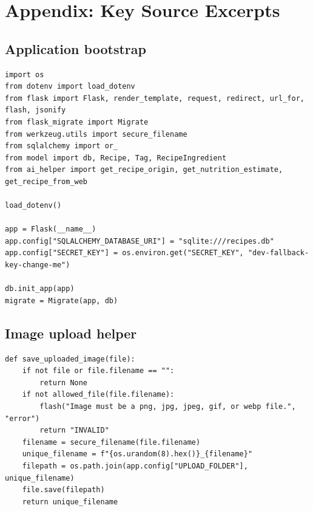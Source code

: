\documentclass[11pt,a4paper]{article}
\begin{document}
\appendix
\section{Appendix: Key Source Excerpts}

\subsection{Application bootstrap}
\begin{lstlisting}[caption={app.py --- imports and app setup}]
import os
from dotenv import load_dotenv
from flask import Flask, render_template, request, redirect, url_for, flash, jsonify
from flask_migrate import Migrate
from werkzeug.utils import secure_filename
from sqlalchemy import or_
from model import db, Recipe, Tag, RecipeIngredient
from ai_helper import get_recipe_origin, get_nutrition_estimate, get_recipe_from_web

load_dotenv()

app = Flask(__name__)
app.config["SQLALCHEMY_DATABASE_URI"] = "sqlite:///recipes.db"
app.config["SECRET_KEY"] = os.environ.get("SECRET_KEY", "dev-fallback-key-change-me")

db.init_app(app)
migrate = Migrate(app, db)
\end{lstlisting}

\subsection{Image upload helper}
\begin{lstlisting}[caption={app.py --- save\_uploaded\_image}]
def save_uploaded_image(file):
    if not file or file.filename == "":
        return None
    if not allowed_file(file.filename):
        flash("Image must be a png, jpg, jpeg, gif, or webp file.", "error")
        return "INVALID"
    filename = secure_filename(file.filename)
    unique_filename = f"{os.urandom(8).hex()}_{filename}"
    filepath = os.path.join(app.config["UPLOAD_FOLDER"], unique_filename)
    file.save(filepath)
    return unique_filename
\end{lstlisting}
\end{document}
